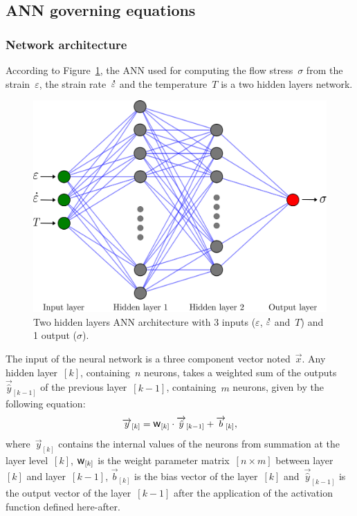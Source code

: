 \documentclass[algorithms,article,submit,pdftex,oneauthors]{Definitions/mdpi}
\DeclareRobustCommand{\w}{\mbox{\large\ensuremath{\mathsf{w}}}}
\DeclareRobustCommand{\lay}[1]{_{[#1]}}
\DeclareRobustCommand{\Lay}[1]{\mbox{$[#1]$}}
\DeclareRobustCommand{\mdot}[1]{\accentset{\mbox{\bfseries .}}{#1}}
\begin{document}
\subsection{ANN governing equations}\label{subsec:ANN-eqn}

\subsubsection{Network architecture}\label{subsubsec:ANN-arch}
According to Figure~\ref{fig:ANN-2HL}, the ANN used for computing the flow stress~$\sigma$ from the strain~$\varepsilon$, the strain rate~$\mdot{\varepsilon}$ and the temperature~$T$ is a two hidden layers network.
\begin{figure}[h!]
\centering
\includegraphics[width=0.55\columnwidth]{Figures/ANN-2HL}
\caption{Two hidden layers ANN architecture with 3 inputs ($\varepsilon$, $\mdot{\varepsilon}$ and~$T$) and 1 output ($\sigma$).}
\label{fig:ANN-2HL}
\end{figure}
The input of the neural network is a three component vector noted~$\overrightarrow{x}$.
Any hidden layer~\Lay{k}, containing~$n$ neurons, takes a weighted sum of the outputs~$\overrightarrow{\hat{y}}\lay{k-1}$ of the previous layer~\Lay{k-1}, containing~$m$ neurons, given by the following equation:
\begin{equation}
\overrightarrow{y}\lay{k} = \w\lay{k} \cdot \overrightarrow{\hat{y}}\lay{k-1}+ \overrightarrow{b}\lay{k}\label{eq:ANN-y},
\end{equation}
where~$\overrightarrow{y}\lay{k}$ contains the internal values of the neurons from summation at the layer level~\Lay{k}, $\w\lay{k}$ is the weight parameter matrix~$[n\times m]$ between layer~\Lay{k} and layer~\Lay{k-1}, $\overrightarrow{b}\lay{k}$ is the bias vector of the layer~\Lay{k} and~$\overrightarrow{\hat{y}}\lay{k-1}$ is the output vector of the layer~\Lay{k-1} after the application of the activation function defined here-after.
\end{document}
